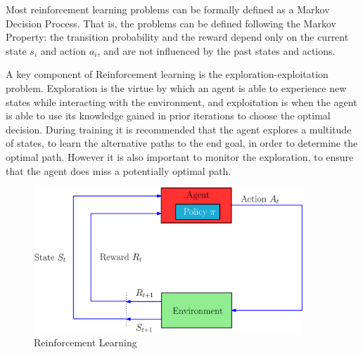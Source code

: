 
Most reinforcement learning problems can be formally defined as a
Markov Decision Process. That is, the problems can be defined
following the Markov Property: the transition probability and the
reward depend only on the current state $s_{i} $ and action $a_{i} $,
and are not influenced by the past states and actions.


A key component of Reinforcement learning is the
exploration-exploitation problem. Exploration is the virtue
by which an agent is able to experience new states while
interacting with the environment, and exploitation is when
the agent is able to use its knowledge gained in prior
iterations to choose the optimal decision. During training it
is recommended that the agent explores a multitude of states,
to learn the alternative paths to the end goal, in order to
determine the optimal path. However it is also important to
monitor the exploration, to ensure that the agent does miss a
potentially optimal path.

\begin{figure}[H]
    \centering
    \includegraphics[width=0.9\textwidth]{images/rlv3.png}
    \caption{Reinforcement Learning}
    \label{fig:rl}
\end{figure}


